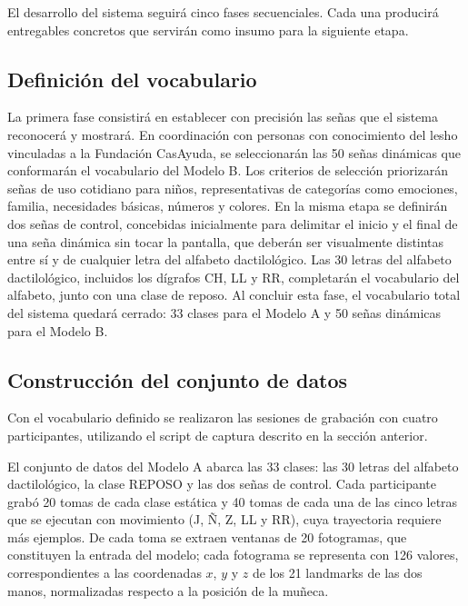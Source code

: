 El desarrollo del sistema seguirá cinco fases secuenciales. Cada una producirá entregables
concretos que servirán como insumo para la siguiente etapa.

\subsection{Definición del vocabulario}

La primera fase consistirá en establecer con precisión las señas que el sistema
reconocerá y mostrará. En coordinación con personas con conocimiento del \acrshort{lesho}
vinculadas a la Fundación CasAyuda, se seleccionarán las 50 señas
dinámicas que conformarán el vocabulario del Modelo B. Los criterios de selección
priorizarán señas de uso cotidiano para niños, representativas de categorías como
emociones, familia, necesidades básicas, números y colores. En la misma etapa se definirán
dos señas de control, concebidas inicialmente para delimitar el inicio y el final de una
seña dinámica sin tocar la pantalla, que deberán ser visualmente distintas entre sí y de
cualquier letra del alfabeto dactilológico. Las 30 letras del alfabeto dactilológico,
incluidos los dígrafos CH, LL y RR, completarán el vocabulario del alfabeto, junto con una
clase de reposo. Al concluir esta fase, el vocabulario total del sistema quedará cerrado:
33 clases para el Modelo A y 50 señas dinámicas para el Modelo B.

\subsection{Construcción del conjunto de datos}

Con el vocabulario definido se realizaron las sesiones de grabación con cuatro
participantes, utilizando el script de captura descrito en la sección anterior.

El conjunto de datos del Modelo A abarca las 33 clases: las 30 letras del alfabeto
dactilológico, la clase REPOSO y las dos señas de control. Cada participante grabó 20
tomas de cada clase estática y 40 tomas de cada una de las cinco letras que se ejecutan con
movimiento (J, Ñ, Z, LL y RR), cuya trayectoria requiere más ejemplos. De cada toma se
extraen ventanas de 20 fotogramas, que constituyen la entrada del modelo; cada fotograma se
representa con 126 valores, correspondientes a las coordenadas $x$, $y$ y $z$ de los 21
landmarks de las dos manos, normalizadas respecto a la posición de la muñeca.

